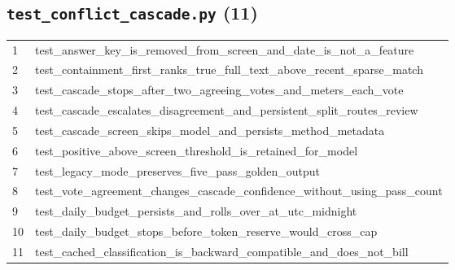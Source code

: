 \subsection*{\texttt{test\_conflict\_cascade.py} (11)}
\begin{longtable}{p{}p{}}
1 & test\_answer\_key\_is\_removed\_from\_screen\_and\_date\_is\_not\_a\_feature \\
2 & test\_containment\_first\_ranks\_true\_full\_text\_above\_recent\_sparse\_match \\
3 & test\_cascade\_stops\_after\_two\_agreeing\_votes\_and\_meters\_each\_vote \\
4 & test\_cascade\_escalates\_disagreement\_and\_persistent\_split\_routes\_review \\
5 & test\_cascade\_screen\_skips\_model\_and\_persists\_method\_metadata \\
6 & test\_positive\_above\_screen\_threshold\_is\_retained\_for\_model \\
7 & test\_legacy\_mode\_preserves\_five\_pass\_golden\_output \\
8 & test\_vote\_agreement\_changes\_cascade\_confidence\_without\_using\_pass\_count \\
9 & test\_daily\_budget\_persists\_and\_rolls\_over\_at\_utc\_midnight \\
10 & test\_daily\_budget\_stops\_before\_token\_reserve\_would\_cross\_cap \\
11 & test\_cached\_classification\_is\_backward\_compatible\_and\_does\_not\_bill \\
\end{longtable}
